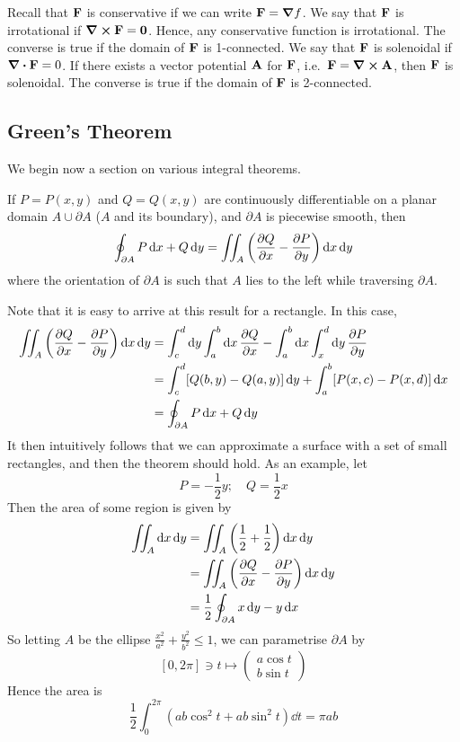 Recall that \(\vb F\) is conservative if we can write \(\vb F = \grad f\). We say that \(\vb F\) is irrotational if \(\curl{\vb F} = \vb 0\). Hence, any conservative function is irrotational. The converse is true if the domain of \(\vb F\) is 1-connected. We say that \(\vb F\) is solenoidal if \(\div{\vb F} = 0\). If there exists a vector potential \(\vb A\) for \(\vb F\), i.e.\ \(\vb F = \curl{\vb A}\), then \(\vb F\) is solenoidal. The converse is true if the domain of \(\vb F\) is 2-connected.

\subsection{Green's Theorem}
We begin now a section on various integral theorems.
\begin{proposition}
	If \(P = P(x, y)\) and \(Q = Q(x, y)\) are continuously differentiable on a planar domain \(A \cup \partial A\) (\(A\) and its boundary), and \(\partial A\) is piecewise smooth, then
	\[ \oint_{\partial A} P \dd{x} + Q \dd{y} = \iint_{A} \left( \pdv{Q}{x} - \pdv{P}{y} \right) \dd{x}\dd{y} \]
	where the orientation of \(\partial A\) is such that \(A\) lies to the left while traversing \(\partial A\).
\end{proposition}
\noindent Note that it is easy to arrive at this result for a rectangle. In this case,
\begin{align*}
	\iint_{A} \left( \pdv{Q}{x} - \pdv{P}{y} \right) \dd{x}\dd{y} & = \int_c^d \dd{y} \int_a^b \dd{x} \pdv{Q}{x} - \int_a^b \dd{x} \int_x^d \dd{y} \pdv{P}{y} \\
	                                                              & = \int_c^d [Q(b, y) - Q(a, y)] \dd{y} + \int_a^b [P(x, c) - P(x, d)] \dd{x}               \\
	                                                              & = \oint_{\partial A} P \dd{x} + Q \dd{y}
\end{align*}
It then intuitively follows that we can approximate a surface with a set of small rectangles, and then the theorem should hold. As an example, let
\[ P = -\frac{1}{2}y;\quad Q = \frac{1}{2}x\]
Then the area of some region is given by
\begin{align*}
	\iint_A \dd{x}\dd{y} & = \iint_A \left( \frac{1}{2} + \frac{1}{2} \right) \dd{x}\dd{y} \\
	                     & = \iint_A \left( \pdv{Q}{x} - \pdv{P}{y} \right) \dd{x}\dd{y}   \\
	                     & = \frac{1}{2}\oint_{\partial A} x\dd{y} - y\dd{x}
\end{align*}
So letting \(A\) be the ellipse \(\frac{x^2}{a^2} + \frac{y^2}{b^2} \leq 1\), we can parametrise \(\partial A\) by
\[ [0, 2 \pi] \ni t \mapsto \begin{pmatrix}
		a \cos t \\ b \sin t
	\end{pmatrix} \]
Hence the area is
\[ \frac{1}{2}\int_0^{2\pi} \left( ab\cos^2 t + ab\sin^2 t \right) \dd{t} = \pi ab \]
